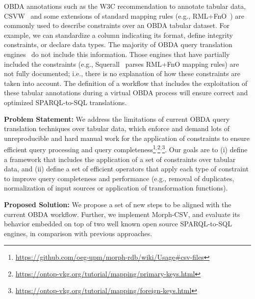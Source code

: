 OBDA annotations such as the W3C recommendation to annotate tabular data, CSVW~\citep{tennison2015model} and some extensions of standard mapping rules (e.g., RML+FnO~\citep{de2017declarative}) are commonly used to describe constraints over an OBDA tabular dataset. For example, we can standardize a column indicating its format, define integrity constraints, or declare data types. The majority of OBDA query translation engines~\citep{priyatna2014formalisation,endris2019ontario} do not include this information. Those engines that have partially included the constraints (e.g., Squerall~\citep{mami2019squerall} parses RML+FnO mapping rules) are not fully documented; i.e., there is no explanation of how these constraints are taken into account. The definition of a workflow that includes the exploitation of these tabular annotations during a virtual OBDA process will ensure correct and optimized SPARQL-to-SQL translations.

\noindent\textbf{Problem Statement:} 
We address the limitations of current OBDA query translation techniques over tabular data, which enforce and demand lots of unreproducible and hard manual work for the application of constraints to ensure efficient query processing and query completeness\footnote{\url{https://github.com/oeg-upm/morph-rdb/wiki/Usage\#csv-files}}$^,$\footnote{\url{https://ontop-vkg.org/tutorial/mapping/primary-keys.html}}$^,$\footnote{\url{https://ontop-vkg.org/tutorial/mapping/foreign-keys.html}}. Our goals are to (i) define a framework that includes the application of a set of constraints over tabular data, and (ii) define a set of efficient operators that apply each type of constraint to improve query completeness and performance (e.g., removal of duplicates, normalization of input sources or application of transformation functions). 

\noindent\textbf{Proposed Solution:} 
We propose a set of new steps to be aligned with the current OBDA workflow. Further, we implement Morph-CSV, and evaluate its behavior embedded on top of two well known open source SPARQL-to-SQL engines, in comparison with previous approaches.

